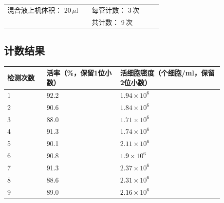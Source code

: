 \documentclass[UTF8,10pt,a4paper,fontset=fandol]{ctexart}
\newcommand{\fieldvalue}[1]{#1}
\newcommand{\handwritten}[1]{#1}
\begin{document}
\begin{tabular}{@{}p{0.50\linewidth}p{0.42\linewidth}@{}}
混合液上机体积：
\fieldvalue{20}\,$\mu\mathrm{l}$
&
每管计数：
\fieldvalue{3}\,次
\\
&
共计数：
\fieldvalue{9}\,次
\end{tabular}

\subsection*{计数结果}

\begin{tabular}{|p{0.16\linewidth}|p{0.30\linewidth}|p{0.42\linewidth}|}
\hline
检测次数 & 活率（\%，保留1位小数） & 活细胞密度（个细胞/ml，保留2位小数）\\
\hline
1 &
\fieldvalue{\handwritten{92.2}} &
\fieldvalue{\handwritten{$1.94\times10^{6}$}}\\
\hline
2 &
\fieldvalue{\handwritten{90.6}} &
\fieldvalue{\handwritten{$1.84\times10^{6}$}}\\
\hline
3 &
\fieldvalue{\handwritten{88.0}} &
\fieldvalue{\handwritten{$1.71\times10^{6}$}}\\
\hline
4 &
\fieldvalue{\handwritten{91.3}} &
\fieldvalue{\handwritten{$1.74\times10^{6}$}}\\
\hline
5 &
\fieldvalue{\handwritten{90.1}} &
\fieldvalue{\handwritten{$2.11\times10^{6}$}}\\
\hline
6 &
\fieldvalue{\handwritten{90.8}} &
\fieldvalue{\handwritten{$1.9\times10^{6}$}}\\
\hline
7 &
\fieldvalue{\handwritten{91.3}} &
\fieldvalue{\handwritten{$2.37\times10^{6}$}}\\
\hline
8 &
\fieldvalue{\handwritten{88.6}} &
\fieldvalue{\handwritten{$2.31\times10^{6}$}}\\
\hline
9 &
\fieldvalue{\handwritten{89.0}} &
\fieldvalue{\handwritten{$2.16\times10^{6}$}}\\
\hline
\end{tabular}
\end{document}

